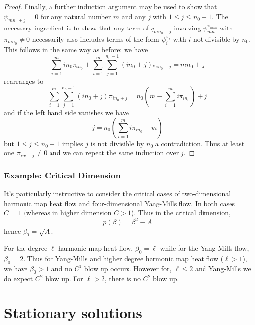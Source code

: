 \documentclass{amsart}
\begin{document}
\begin{proof}
Finally, a further induction argument may be used to show that \(\psi_{m n_0 +j} = 0\) for any natural number \(m\) and any \(j\) with \(1 \leq j \leq n_0 - 1\). The necessary ingredient is to show that any term of \(q_{m n_0 + j}\) involving \(\psi_{m n_0}^{\pi_{m n_0}}\) with \(\pi_{m n_0} \ne 0\) necessarily also includes terms of the form \(\psi_i^{\pi_i}\) with \(i\) not divisible by \(n_0\). This follows in the same way as before: we have
\[
\sum_{i=1}^m i n_0 \pi_{i n_0} + \sum_{i=1}^m \sum_{j=1}^{n_0 -1} (i n_0 + j) \pi_{i n_0 + j} = m n_0 + j
\]
rearranges to
\[
\sum_{i=1}^m \sum_{j=1}^{n_0 -1} (i n_0 + j) \pi_{i n_0 + j} = n_0\left(m - \sum_{i=1}^m i \pi_{i n_0}\right) + j
\]
and if the left hand side vanishes we have
\[
j = n_0\left(\sum_{i=1}^m i \pi_{i n_0} - m\right)
\]
but \(1 \leq j \leq n_0 - 1\) implies \(j\) is not divisible by \(n_0\) a contradiction. Thus at least one \(\pi_{im + j} \ne 0\) and we can repeat the same induction over \(j\).
\end{proof}

\subsubsection*{Example: Critical Dimension}

It's particularly instructive to consider the critical cases of two-dimensional harmonic map heat flow and four-dimensional Yang-Mills flow. In both cases \(C = 1\) (whereas in higher dimension \(C > 1\)). Thus in the critical dimension,
\[
p(\beta) = \beta^2 - A
\]
hence \(\beta_0 = \sqrt{A}\).

For the degree \(\ell\)-harmonic map heat flow, \(\beta_0 = \ell\) while for the Yang-Mills flow, \(\beta_0 = 2\). Thus for Yang-Mills and higher degree harmonic map heat flow (\(\ell > 1\)), we have \(\beta_0 > 1\) and no \(C^1\) blow up occurs. However for, \(\ell \leq 2\) and Yang-Mills we do expect \(C^2\) blow up. For \(\ell > 2\), there is no \(C^2\) blow up.

\section{Stationary solutions}
\label{sec:stationary}
\end{document}
